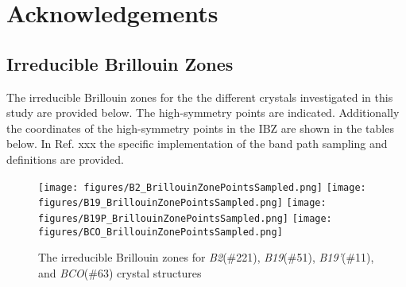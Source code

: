 \documentclass[preprint]{elsarticle}
\begin{document}
\section*{Acknowledgements}

\appendix
\subsection{Irreducible Brillouin Zones}
\label{sec:appx_ibz}

The irreducible Brillouin zones for the the different crystals investigated in this study are provided below. The high-symmetry points are indicated. Additionally the coordinates of the high-symmetry points in the IBZ are shown in the tables below. In Ref. xxx the  specific implementation of the band path sampling and definitions are provided.

\begin{figure}[!htp]                                                                                      
    \begin{centering}                                                                                    
      \texttt{[image: figures/B2\_BrillouinZonePointsSampled.png]} 
      \vspace{1mm}                                                                                       
      \texttt{[image: figures/B19\_BrillouinZonePointsSampled.png]}
      \vspace{1mm}
      \texttt{[image: figures/B19P\_BrillouinZonePointsSampled.png]}
      \vspace{1mm}
      \texttt{[image: figures/BCO\_BrillouinZonePointsSampled.png]}
      \vspace{1mm}                                                                                       
      \caption{The irreducible Brillouin zones for \textit{B2}(\#221), \textit{B19}(\#51), \textit{B19'}(\#11), and \textit{BCO}(\#63) crystal structures}                                                               \label{fig:ibz}                                                                          
    \end{centering}                                                                                      
\end{figure} 

\end{document}
